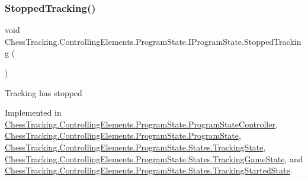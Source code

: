\mbox{\label{interface_chess_tracking_1_1_controlling_elements_1_1_program_state_1_1_i_program_state_aa8c051432b41c20be372d050635d84af}} 
\subsubsection{\texorpdfstring{StoppedTracking()}{StoppedTracking()}}
{\footnotesize\ttfamily void Chess\+Tracking.\+Controlling\+Elements.\+Program\+State.\+I\+Program\+State.\+Stopped\+Tracking (\begin{DoxyParamCaption}{ }\end{DoxyParamCaption})}



Tracking has stopped 



Implemented in \mbox{\hyperlink{class_chess_tracking_1_1_controlling_elements_1_1_program_state_1_1_program_state_controller_a565a98e53eef118e055172bca8672fae}{Chess\+Tracking.\+Controlling\+Elements.\+Program\+State.\+Program\+State\+Controller}}, \mbox{\hyperlink{class_chess_tracking_1_1_controlling_elements_1_1_program_state_1_1_program_state_a0c86a45963ed8eb2b938f5d8f2d956ff}{Chess\+Tracking.\+Controlling\+Elements.\+Program\+State.\+Program\+State}}, \mbox{\hyperlink{class_chess_tracking_1_1_controlling_elements_1_1_program_state_1_1_states_1_1_tracking_state_ad0e9790393a45fd5508f871864d09c04}{Chess\+Tracking.\+Controlling\+Elements.\+Program\+State.\+States.\+Tracking\+State}}, \mbox{\hyperlink{class_chess_tracking_1_1_controlling_elements_1_1_program_state_1_1_states_1_1_tracking_game_state_a403e1536e7a40f736bc8d4b2e7c7aed1}{Chess\+Tracking.\+Controlling\+Elements.\+Program\+State.\+States.\+Tracking\+Game\+State}}, and \mbox{\hyperlink{class_chess_tracking_1_1_controlling_elements_1_1_program_state_1_1_states_1_1_tracking_started_state_af5c55ca3a77c8b0d227d688ba3b2fc69}{Chess\+Tracking.\+Controlling\+Elements.\+Program\+State.\+States.\+Tracking\+Started\+State}}.

\mbox{\label{interface_chess_tracking_1_1_controlling_elements_1_1_program_state_1_1_i_program_state_ae544420adecf8b0f6a58863cb3f89b1a}} 
